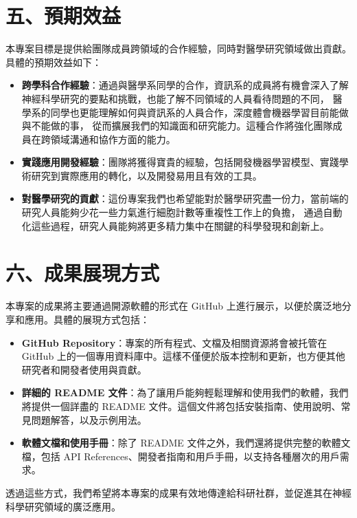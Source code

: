 \documentclass[12pt,a4paper]{article}
\begin{document}
\section*{五、預期效益}
本專案目標是提供給團隊成員跨領域的合作經驗，同時對醫學研究領域做出貢獻。具體的預期效益如下：
\begin{itemize}
    \item \textbf{跨學科合作經驗}：通過與醫學系同學的合作，資訊系的成員將有機會深入了解神經科學研究的要點和挑戰，也能了解不同領域的人員看待問題的不同，
    醫學系的同學也更能理解如何與資訊系的人員合作，深度體會機器學習目前能做與不能做的事，
    從而擴展我們的知識面和研究能力。這種合作將強化團隊成員在跨領域溝通和協作方面的能力。
    
    \item \textbf{實踐應用開發經驗}：團隊將獲得寶貴的經驗，包括開發機器學習模型、實踐學術研究到實際應用的轉化，以及開發易用且有效的工具。
    
    \item \textbf{對醫學研究的貢獻}：這份專案我們也希望能對於醫學研究盡一份力，當前端的研究人員能夠少花一些力氣進行細胞計數等重複性工作上的負擔，
    通過自動化這些過程，研究人員能夠將更多精力集中在關鍵的科學發現和創新上。
\end{itemize}

\section*{六、成果展現方式}
本專案的成果將主要通過開源軟體的形式在 GitHub 上進行展示，以便於廣泛地分享和應用。具體的展現方式包括：
\begin{itemize}
    \item \textbf{GitHub Repository}：專案的所有程式、文檔及相關資源將會被托管在 GitHub 上的一個專用資料庫中。這樣不僅便於版本控制和更新，也方便其他研究者和開發者使用與貢獻。

    \item \textbf{詳細的 README 文件}：為了讓用戶能夠輕鬆理解和使用我們的軟體，我們將提供一個詳盡的 README 文件。這個文件將包括安裝指南、使用說明、常見問題解答，以及示例用法。

    \item \textbf{軟體文檔和使用手冊}：除了 README 文件之外，我們還將提供完整的軟體文檔，包括 API References、開發者指南和用戶手冊，以支持各種層次的用戶需求。
\end{itemize}

透過這些方式，我們希望將本專案的成果有效地傳達給科研社群，並促進其在神經科學研究領域的廣泛應用。
\end{document}
